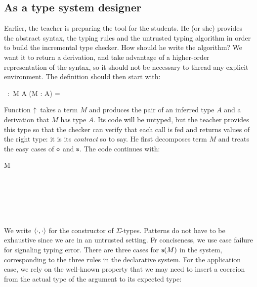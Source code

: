 \documentclass{llncs}
\begin{document}
\subsection{As a type system designer}
\label{sec:lang-incr}

Earlier, the teacher is preparing the tool for the students. He (or
she) provides the abstract syntax, the typing rules and the untrusted
typing algorithm in order to build the incremental type checker. How
should he write the algorithm? We want it to return a derivation, and
take advantage of a higher-order representation of the syntax, so it
should not be necessary to thread any explicit environment. The
definition should then start with:

\begin{mathleft}
  \finfer{}\ :\ \prd M {} \sig A {} (\vdash M : A) =
\end{mathleft}

\noindent
Function $\uparrow\!{}$ takes a term $M$ and produces the pair of an
inferred type $A$ and a derivation that $M$ has type $A$. Its code
will be untyped, but the teacher provides this type so that the
checker can verify that each call is fed and returns values of the
right type: it is its \emph{contract} so to say. He first decomposes
term $M$ and treats the easy cases of $\text{\textsf{o}}$ and $\text{\textsf{s}}$. The
code continues with:

\begin{mathleft}
  \lamd M  \\
  \quad\caseb{\z}  \\
  \quad{}
   \\
  \quad\quad{}
   \\
  \quad\quad{}
   \\
  \quad\quad{}
   \\
\end{mathleft}

\noindent
We write $\langle{\cdot}, {\cdot}\rangle$ for the constructor of $\Sigma$-types.
Patterns do not have to be exhaustive since we are in an untrusted
setting. Fr conciseness, we use case failure for signaling typing
error. There are three cases for $\text{\textsf{s}} ({M})$ in the system, corresponding
to the three rules in the declarative system. For the application
case, we rely on the well-known property that we may need to insert a
coercion from the actual type of the argument to its expected type:
\end{document}
